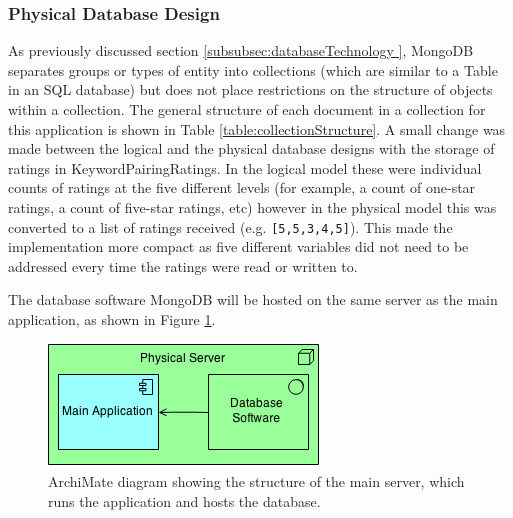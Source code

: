 \documentclass[authoryearcitations]{UoYCSproject}
\begin{document}
\subsubsection{Physical Database Design}
\label{subsubsec:physicalDatabaseDesign}
As previously discussed section \ref{subsubsec:databaseTechnology }, MongoDB separates groups or types of entity into collections (which are similar to a Table in an SQL database) but does not place restrictions on the structure of objects within a collection.  The general structure of each document in a collection for this application is shown in Table \ref{table:collectionStructure}. A small change was made between the logical and the physical database designs with the storage of ratings in KeywordPairingRatings. In the logical model these were individual counts of ratings at the five different levels (for example, a count of one-star ratings, a count of five-star ratings, etc) however in the physical model this was converted to a list of ratings received (e.g. \texttt{[5,5,3,4,5]}). This made the implementation more compact as five different variables did not need to be addressed every time the ratings were read or written to.

The database software MongoDB will be hosted on the same server as the main application, as shown in Figure \ref{fig:physicalServerDb}.

\begin{figure}[htb] 
\centerline{\includegraphics[width=0.6\linewidth]{physicalServerDb}}
\caption{ArchiMate diagram showing the structure of the main server, which runs the application and hosts the database.}
\label{fig:physicalServerDb}
\end{figure}
\end{document}
